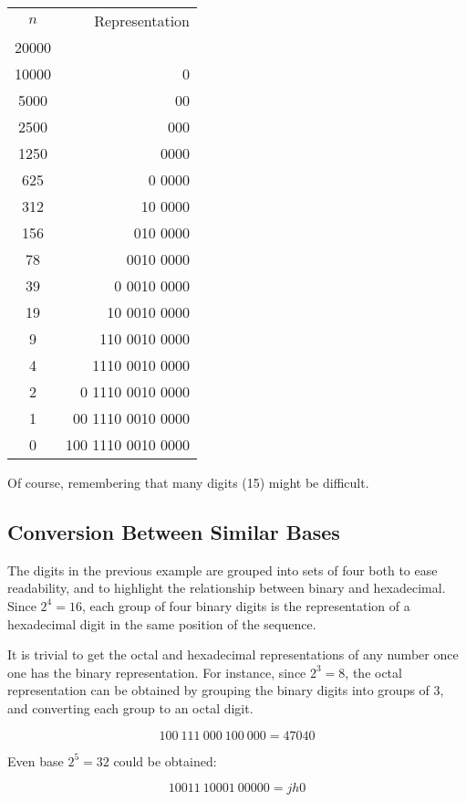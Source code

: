 \documentclass[12pt]{article}
\begin{document}
\begin{tabular}{|c|r|}
$n$ & Representation \\
20000 & \\
10000 & 0 \\
5000 & 00 \\
2500 & 000 \\
1250 & 0000 \\
625 & 0 0000 \\
312 & 10 0000 \\
156 & 010 0000 \\
78 & 0010 0000 \\
39 & 0 0010 0000 \\
19 & 10 0010 0000 \\
9 & 110 0010 0000 \\
4 & 1110 0010 0000 \\
2 & 0 1110 0010 0000 \\
1 & 00 1110 0010 0000 \\
0 & 100 1110 0010 0000
\end{tabular}

Of course, remembering that many digits (15) might be difficult.

\subsection*{Conversion Between Similar Bases}

The digits in the previous example are grouped into sets of four both to ease readability, and to highlight the relationship between binary and hexadecimal.  Since $2^4 = 16$, each group of four binary digits is the representation of a hexadecimal digit in the same position of the sequence.

It is trivial to get the octal and hexadecimal representations of any number once one has the binary representation.  For instance, since $2^3 = 8$, the octal representation can be obtained by grouping the binary digits into groups of 3, and converting each group to an octal digit.

$$
100 \: 111 \: 000 \: 100 \: 000 = 47040
$$

Even base $2^5 = 32$ could be obtained:

$$
10011 \: 10001 \: 00000 = jh0
$$
\end{document}
